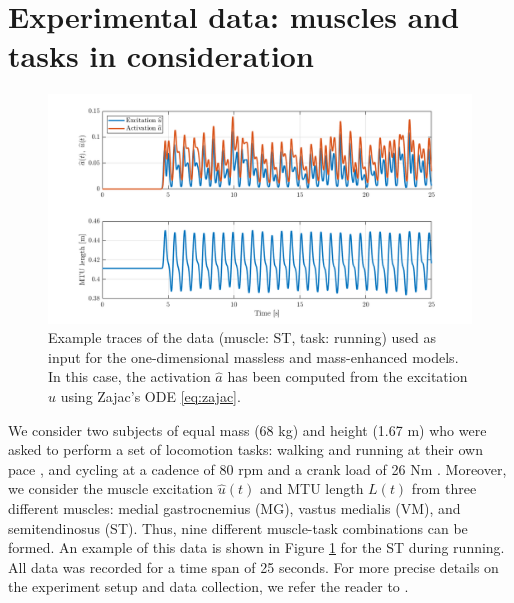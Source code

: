 \documentclass{sfuthesis}
\numberwithin{equation}{chapter}
\numberwithin{figure}{chapter}
\numberwithin{table}{chapter}
\theoremstyle{definition}
\begin{document}
\section{Experimental data: muscles and tasks in consideration} \label{sec:experimental_data}

\begin{figure}
    \centering
    \includegraphics[width=\textwidth]{example-traces-activation-mtulength.png}
    \caption{Example traces of the data (muscle: ST, task: running) used as input for the one-dimensional massless and mass-enhanced models. In this case, the activation $\widehat{a}$ has been computed from the excitation $\widehat{u}$ using Zajac's ODE \eqref{eq:zajac}.}
    \label{fig:traces_act_mtu_length}
\end{figure}

We consider two subjects of equal mass (68 kg) and height (1.67 m) who were asked to perform a set of locomotion tasks: walking and running at their own pace \cite{EvanThesis}, and cycling at a cadence of 80 rpm and a crank load of 26 Nm \cite{Dick2016}. Moreover, we consider the muscle excitation $\widehat{u}(t)$ and MTU length $L(t)$ from three different muscles: medial gastrocnemius (MG), vastus medialis (VM), and semitendinosus (ST). Thus, nine different muscle-task combinations can be formed. An example of this data is shown in Figure \ref{fig:traces_act_mtu_length} for the ST during running. All data was recorded for a time span of 25 seconds. For more precise details on the experiment setup and data collection, we refer the reader to \cite{EvanThesis}.

\end{document}
